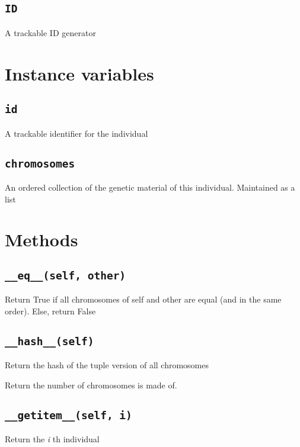 \documentclass[letterpaper,10pt,english]{sphinxmanual}
\begin{document}
\subsection{\texttt{ID}}
\label{individual.py:id}
A trackable ID generator


\section{Instance variables}
\label{individual.py:instance-variables}

\subsection{\texttt{id}}
\label{individual.py:id1}
A trackable identifier for the individual


\subsection{\texttt{chromosomes}}
\label{individual.py:chromosomes}
An ordered collection of the genetic material of this individual. Maintained as a list


\section{Methods}
\label{individual.py:methods}

\subsection{\texttt{\_\_eq\_\_(self, other)}}
\label{individual.py:eq-self-other}
Return True if all chromosomes of self and other are equal (and in the same order).
Else, return False


\subsection{\texttt{\_\_hash\_\_(self)}}
\label{individual.py:hash-self}
Return the hash of the tuple version of all chromosomes

Return the number of chromosomes  is made of.


\subsection{\texttt{\_\_getitem\_\_(self, i)}}
\label{individual.py:getitem-self-i}
Return the \emph{i} th individual
\end{document}
